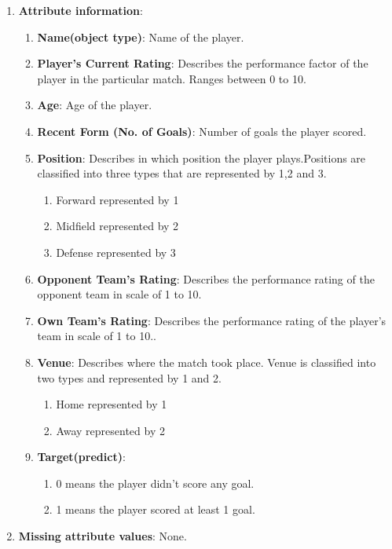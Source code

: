 \documentclass[10pt,a4paper]{article}
\begin{document}
\begin{enumerate}
    
    \item\textbf{Attribute information}:
    \begin{enumerate}
    \item\textbf{Name(object type)}: Name of the player.
    \item\textbf{Player's Current Rating}: Describes the performance factor of the player in the particular match. Ranges between 0 to 10.
    \item\textbf{Age}: Age of the player.
    \item\textbf{Recent Form (No. of Goals)}: Number of goals the player scored.
    \item\textbf{Position}: Describes in which position the player plays.Positions are classified into three types that are represented by 1,2 and 3.
    \begin{enumerate}
        \item Forward represented by 1
        \item Midfield represented by 2
        \item Defense represented by 3
    \end{enumerate}
    \item\textbf{Opponent Team's Rating}: Describes the performance rating of the opponent team in scale of 1 to 10.
    \item\textbf{Own Team's Rating}: Describes the performance rating of the player's team in scale of 1 to 10..
    \item\textbf{Venue}: Describes where the match took place. Venue is classified into two types and represented by 1 and 2.
    \begin{enumerate}
        \item Home represented by 1
        \item Away represented by 2
    \end{enumerate}
    \item\textbf{Target(predict)}:
    \begin{enumerate}
        \item 0 means the player didn't score any goal.
        \item 1 means the player scored at least 1 goal.
    \end{enumerate}
    \end{enumerate}
    \item\textbf{Missing attribute values}: None.
\end{enumerate}
\end{document}
